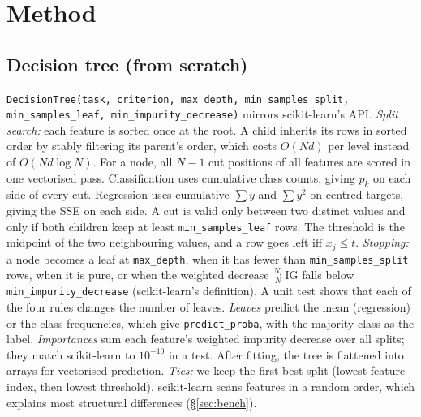\documentclass[10pt,twocolumn,a4paper]{article}
\begin{document}
\section{Method}
\subsection{Decision tree (from scratch)}
\texttt{DecisionTree(task, criterion, max\_depth, min\_samples\_split,
min\_samples\_leaf, min\_impurity\_decrease)} mirrors scikit-learn's API.
\emph{Split search:} each feature is sorted once at the root. A child
inherits its rows in sorted order by stably filtering its parent's order,
which costs $O(Nd)$ per level instead of $O(Nd\log N)$. For a node, all
$N-1$ cut positions of all features are scored in one vectorised pass.
Classification uses cumulative class counts, giving $p_k$ on each side of
every cut. Regression uses cumulative $\sum y$ and $\sum y^2$ on centred
targets, giving the SSE on each side. A cut is valid only between two
distinct values and only if both children keep at least
\texttt{min\_samples\_leaf} rows. The threshold is the midpoint of the two
neighbouring values, and a row goes left iff $x_j\le t$.
\emph{Stopping:} a node becomes a leaf at \texttt{max\_depth}, when it has
fewer than \texttt{min\_samples\_split} rows, when it is pure, or when the
weighted decrease $\frac{N_t}{N}\,\mathrm{IG}$ falls below
\texttt{min\_impurity\_decrease} (scikit-learn's definition). A unit test
shows that each of the four rules changes the number of leaves.
\emph{Leaves} predict the mean (regression) or the class frequencies,
which give \texttt{predict\_proba}, with the majority class as the label.
\emph{Importances} sum each feature's weighted impurity decrease over all
splits; they match scikit-learn to $10^{-10}$ in a test. After fitting, the
tree is flattened into arrays for vectorised prediction.
\emph{Ties:} we keep the first best split (lowest feature index, then
lowest threshold). scikit-learn scans features in a random order, which
explains most structural differences (\S\ref{sec:bench}).
\end{document}
